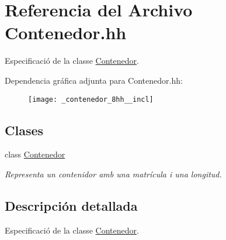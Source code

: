 \hypertarget{_contenedor_8hh}{}\section{Referencia del Archivo Contenedor.\+hh}
\label{_contenedor_8hh}


Especificació de la classe \hyperlink{class_contenedor}{Contenedor}.  


Dependencia gráfica adjunta para Contenedor.\+hh\+:
\nopagebreak
\begin{figure}[H]
\begin{center}
\leavevmode
\texttt{[image: \_contenedor\_8hh\_\_incl]}
\end{center}
\end{figure}
\subsection*{Clases}
\begin{DoxyCompactItemize}
\item 
class \hyperlink{class_contenedor}{Contenedor}
\begin{DoxyCompactList}\small\item\em Representa un contenidor amb una matrícula i una longitud. \end{DoxyCompactList}\end{DoxyCompactItemize}


\subsection{Descripción detallada}
Especificació de la classe \hyperlink{class_contenedor}{Contenedor}. 

